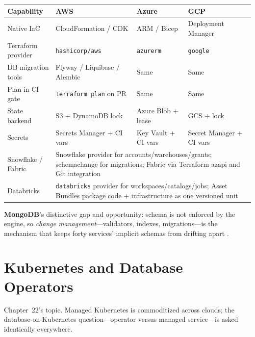 \begin{center}
\footnotesize
\begin{tabular}{@{}p{2.9cm}p{3.0cm}p{3.0cm}p{3.0cm}@{}}
\toprule
\textbf{Capability} & \textbf{AWS} & \textbf{Azure} & \textbf{GCP} \\
\midrule
Native IaC & CloudFormation / CDK & ARM / Bicep & Deployment Manager \\
Terraform provider & \texttt{hashicorp/aws} & \texttt{azurerm} & \texttt{google} \\
DB migration tools & Flyway / Liquibase / Alembic & Same & Same \\
Plan-in-CI gate & \texttt{terraform plan} on PR & Same & Same \\
State backend & S3 + DynamoDB lock & Azure Blob + lease & GCS + lock \\
Secrets & Secrets Manager + CI vars & Key Vault + CI vars & Secret Manager + CI vars \\
\addlinespace
Snowflake / Fabric & \multicolumn{3}{l}{Snowflake provider for accounts/warehouses/grants; schemachange for migrations; Fabric via Terraform azapi and Git integration} \\
Databricks & \multicolumn{3}{l}{\texttt{databricks} provider for workspaces/catalogs/jobs; Asset Bundles package code + infrastructure as one versioned unit} \\
\bottomrule
\end{tabular}
\end{center}

\noindent \textbf{MongoDB}'s distinctive gap and opportunity: schema is not enforced by the
engine, so \emph{change management}---validators, indexes, migrations---is the mechanism that
keeps forty services' implicit schemas from drifting apart \cite{mongodbTerraformDocs,terraformDocs}.

\section{Kubernetes and Database Operators}
%
Chapter~22's topic. Managed Kubernetes is commoditized across clouds; the
database-on-Kubernetes question---operator versus managed service---is asked identically
everywhere.

